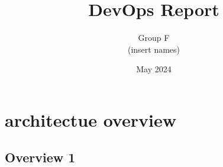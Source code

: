 \documentclass[12pt,a4paper]{report}
\title{DevOps Report}
\author{Group F \\ (insert names)}
\date{May 2024}
\begin{document}
	\maketitle
    \tableofcontents
    \listoffigures
	





    \chapter{architectue overview}
    \section{Overview 1}
    

    

\end{document}
